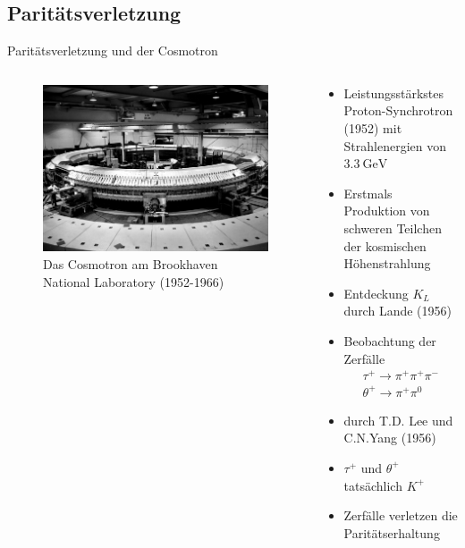 \documentclass[aspectratio=1610, professionalfonts, 9pt, t]{beamer}
\begin{document}
\subsection{Paritätsverletzung}

  \begin{frame}{Paritätsverletzung und der Cosmotron}
    \begin{columns}[onlytextwidth]
      \begin{column}{0.4\textwidth}
        \begin{figure}[ht]
          \begin{center}
            \includegraphics[height=0.6\textheight]{Images/cosmotron.jpg} %
            \caption{Das Cosmotron am Brookhaven National Laboratory (1952-1966)}
          \end{center}
        \end{figure}
      \end{column}
      \begin{column}{0.5\textwidth}
        \begin{itemize}
          \item Leistungsstärkstes Proton-Synchrotron (1952) mit Strahlenergien von $\SI{3.3}{\giga\electronvolt}$
          \item Erstmals Produktion von schweren Teilchen der kosmischen Höhenstrahlung
          \item Entdeckung $K_{L}$ durch Lande (1956) %
          \item Beobachtung der Zerfälle
          \begin{align*}
            \tau^{+} \rightarrow \pi^{+} \pi^{+} \pi^{-} \\
            \theta^{+} \rightarrow \pi^{+} \pi^{0}
          \end{align*}
          \item[] durch T.D. Lee und C.N.Yang (1956)
          \item $\tau^{+}$ und $\theta^{+}$ tatsächlich $K^{+}$
          \item[\rightarrow] Zerfälle verletzen die Paritätserhaltung
        \end{itemize}
      \end{column}
    \end{columns}
  \end{frame}
\end{document}
